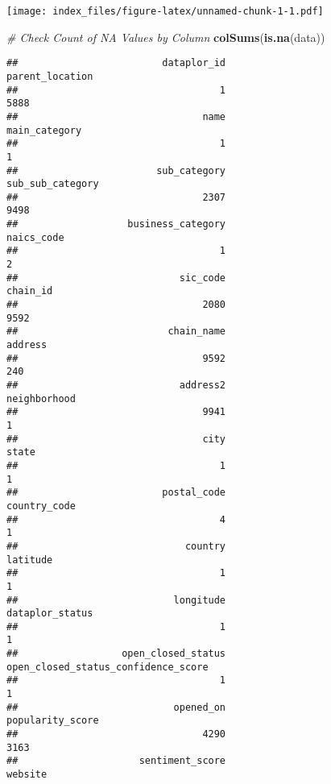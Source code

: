 \documentclass[
]{article}
\newenvironment{Shaded}{\begin{snugshade}}{\end{snugshade}}
\newcommand{\CommentTok}[1]{\textcolor[rgb]{0.56,0.35,0.01}{\textit{#1}}}
\newcommand{\FunctionTok}[1]{\textcolor[rgb]{0.13,0.29,0.53}{\textbf{#1}}}
\newcommand{\NormalTok}[1]{#1}
\begin{document}
\texttt{[image: index\_files/figure-latex/unnamed-chunk-1-1.pdf]}

\begin{Shaded}
\begin{Highlighting}[]
\CommentTok{\# Check Count of NA Values by Column}
\FunctionTok{colSums}\NormalTok{(}\FunctionTok{is.na}\NormalTok{(data))}
\end{Highlighting}
\end{Shaded}

\begin{verbatim}
##                         dataplor_id                     parent_location 
##                                   1                                5888 
##                                name                       main_category 
##                                   1                                   1 
##                        sub_category                    sub_sub_category 
##                                2307                                9498 
##                   business_category                          naics_code 
##                                   1                                   2 
##                            sic_code                            chain_id 
##                                2080                                9592 
##                          chain_name                             address 
##                                9592                                 240 
##                            address2                        neighborhood 
##                                9941                                   1 
##                                city                               state 
##                                   1                                   1 
##                         postal_code                        country_code 
##                                   4                                   1 
##                             country                            latitude 
##                                   1                                   1 
##                           longitude                     dataplor_status 
##                                   1                                   1 
##                  open_closed_status open_closed_status_confidence_score 
##                                   1                                   1 
##                           opened_on                    popularity_score 
##                                4290                                3163 
##                     sentiment_score                             website 

\end{verbatim}
\end{document}

